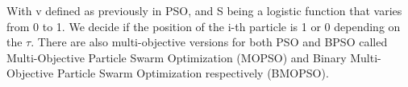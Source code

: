 \documentclass{Configuration_Files/PoliMi3i_thesis}
\begin{document}
With v defined as previously in PSO, and S being a logistic function that varies from 0 to 1.
We decide if the position of the i-th particle is 1 or 0 depending on the $\tau$.
There are also multi-objective versions for both PSO and BPSO called Multi-Objective Particle Swarm Optimization (MOPSO) and Binary Multi-Objective Particle Swarm Optimization respectively (BMOPSO). \cite{coellocoelloMOPSOProposalMultiple2002}





 


\end{document}
